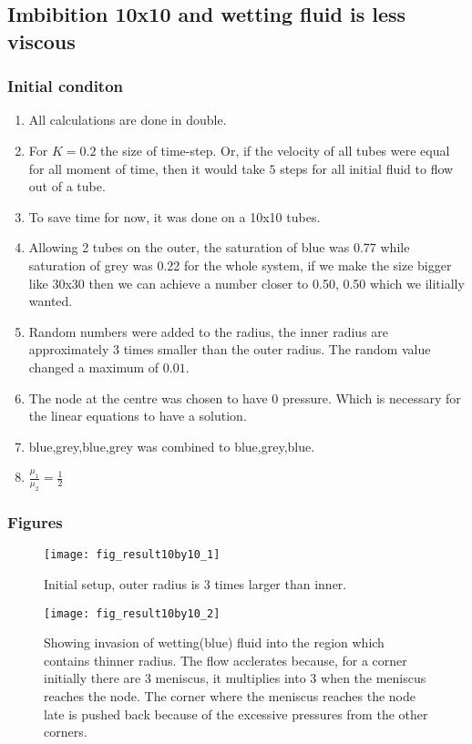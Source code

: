 \subsection{Imbibition 10x10 and wetting fluid is less viscous}
	
	\subsubsection{Initial conditon}
		\begin{enumerate}
			\item All calculations are done in double.
			\item For $K = 0.2$  the size of time-step. Or, if the velocity of all tubes were equal for all moment of time, then it would take $5$ steps for all initial fluid to flow out of a tube.
			\item To save time for now, it was done on a 10x10 tubes.
			\item Allowing 2 tubes on the outer, the saturation of blue was 0.77 while saturation of grey was 0.22 for the whole system, if we make the size bigger like 30x30 then we can achieve a number closer to 0.50, 0.50 which we ilitially wanted. 
			\item Random numbers were added to the radius, the inner radius are approximately 3 times smaller than the outer radius. The random value changed a maximum of $0.01$.
			\item The node at the centre was chosen to have 0 pressure. Which is necessary for the linear equations to have a solution.
			\item blue,grey,blue,grey was combined to blue,grey,blue.
			\item $\frac{\mu_{1}}{\mu_{2}} = \frac{1}{2}$
		\end{enumerate}
	
	\subsubsection{Figures}
		\begin{figure}[H]
			\texttt{[image: fig\_result10by10\_1]}
			\caption{Initial setup, outer radius is 3 times larger than inner.}
			\label{fig_invasion-result1}
		\end{figure}
		
		\begin{figure}[H]
			\texttt{[image: fig\_result10by10\_2]}
			\caption{Showing invasion of wetting(blue) fluid into the region which contains thinner radius. The flow acclerates because, for a corner initially there are 3 meniscus, it multiplies into 3 when the meniscus reaches the node. The corner where the meniscus reaches the node late is pushed back because of the excessive pressures from the other corners.}
			\label{fig_invasion-result2}
		\end{figure}
		
